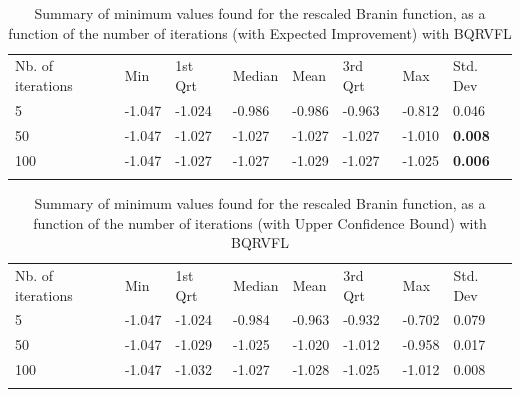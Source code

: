 \begin{table}[!htb]
\begin{center}
\caption{Summary of minimum values found for the rescaled Branin function, as a function of the number of iterations (with Expected Improvement) with BQRVFL}
\label{tab:min_values_bqrvfl_ei}       %
\begin{tabular}{llllllll}
\hline\noalign{\smallskip}
Nb. of iterations & Min & 1st Qrt  & Median & Mean  & 3rd Qrt  & Max & Std. Dev \\
\noalign{\smallskip}\hline\noalign{\smallskip}
  5   & -1.047 & -1.024 & -0.986 & -0.986 & -0.963 & -0.812 & 0.046  \\
  50  & -1.047 & -1.027 & -1.027 & -1.027 & -1.027 & -1.010 & \textbf{0.008} \\
  100 & -1.047 & -1.027 & -1.027 & -1.029 & -1.027 & -1.025 & \textbf{0.006} \\
\noalign{\smallskip}\hline
\end{tabular}
\end{center}
\end{table}

\begin{table}[!htb]
\begin{center}
\caption{Summary of minimum values found for the rescaled Branin function, as a function of the number of iterations (with Upper Confidence Bound) with BQRVFL}
\label{tab:min_values_bqrvfl_ucb}       %
\begin{tabular}{llllllll}
\hline\noalign{\smallskip}
Nb. of iterations & Min & 1st Qrt  & Median & Mean  & 3rd Qrt  & Max & Std. Dev \\
\noalign{\smallskip}\hline\noalign{\smallskip}
  5   & -1.047 & -1.024 & -0.984 & -0.963 & -0.932 & -0.702 & 0.079  \\
  50  & -1.047 & -1.029 & -1.025 & -1.020 & -1.012 & -0.958 & 0.017 \\
  100 & -1.047 & -1.032 & -1.027 & -1.028 & -1.025 & -1.012 & 0.008 \\
\noalign{\smallskip}\hline
\end{tabular}
\end{center}
\end{table}

